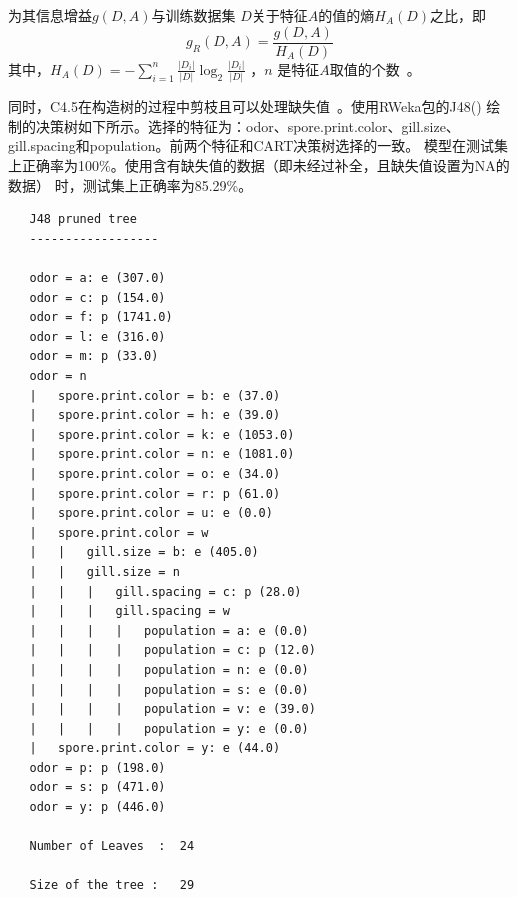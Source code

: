 \documentclass[lang=cn,11pt,a4paper,cite=super]{elegantpaper}
\begin{document}
\begin{enumerate}
\begin{definition}
      为其信息增益$g(D,A)$与训练数据集 $D$关于特征$A$的值的熵$H_A(D)$之比，即
      $$g_{R}(D, A)=\frac{g(D, A)}{H_{A}(D)}$$
      其中，$H_{A}(D)=-\sum_{i=1}^{n} \frac{\left|D_{i}\right|}{|D|} \log _{2} \frac{\left|D_{i}\right|}{|D|}$
      ，$n$ 是特征$A$取值的个数~\cite{lihang}。
   \end{definition}
   \par 同时，C4.5在构造树的过程中剪枝且可以处理缺失值~\cite{c45}。使用RWeka包的J48()
   绘制的决策树如下所示。选择的特征为：odor、spore.print.color、gill.size、
   gill.spacing和population。前两个特征和CART决策树选择的一致。
   模型在测试集上正确率为100\%。使用含有缺失值的数据（即未经过补全，且缺失值设置为NA的数据）
   时，测试集上正确率为85.29\%。
\begin{lstlisting}
   J48 pruned tree
   ------------------
   
   odor = a: e (307.0)
   odor = c: p (154.0)
   odor = f: p (1741.0)
   odor = l: e (316.0)
   odor = m: p (33.0)
   odor = n
   |   spore.print.color = b: e (37.0)
   |   spore.print.color = h: e (39.0)
   |   spore.print.color = k: e (1053.0)
   |   spore.print.color = n: e (1081.0)
   |   spore.print.color = o: e (34.0)
   |   spore.print.color = r: p (61.0)
   |   spore.print.color = u: e (0.0)
   |   spore.print.color = w
   |   |   gill.size = b: e (405.0)
   |   |   gill.size = n
   |   |   |   gill.spacing = c: p (28.0)
   |   |   |   gill.spacing = w
   |   |   |   |   population = a: e (0.0)
   |   |   |   |   population = c: p (12.0)
   |   |   |   |   population = n: e (0.0)
   |   |   |   |   population = s: e (0.0)
   |   |   |   |   population = v: e (39.0)
   |   |   |   |   population = y: e (0.0)
   |   spore.print.color = y: e (44.0)
   odor = p: p (198.0)
   odor = s: p (471.0)
   odor = y: p (446.0)
   
   Number of Leaves  : 	24
   
   Size of the tree : 	29
\end{lstlisting}


\end{enumerate}
\end{document}
